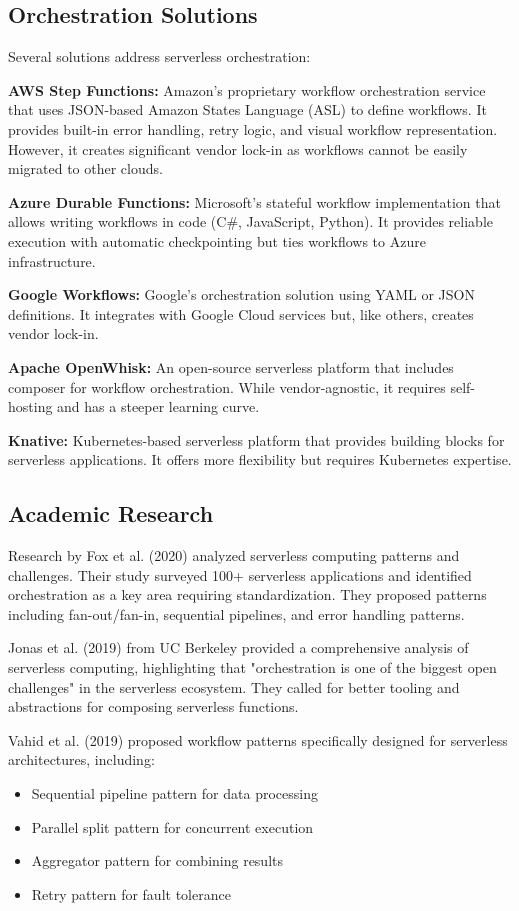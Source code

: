 \documentclass{fisatprojectfinal}
\begin{document}
\subsection{Orchestration Solutions}
Several solutions address serverless orchestration:

\textbf{AWS Step Functions:} Amazon's proprietary workflow orchestration service that uses JSON-based Amazon States Language (ASL) to define workflows. It provides built-in error handling, retry logic, and visual workflow representation. However, it creates significant vendor lock-in as workflows cannot be easily migrated to other clouds.

\textbf{Azure Durable Functions:} Microsoft's stateful workflow implementation that allows writing workflows in code (C\#, JavaScript, Python). It provides reliable execution with automatic checkpointing but ties workflows to Azure infrastructure.

\textbf{Google Workflows:} Google's orchestration solution using YAML or JSON definitions. It integrates with Google Cloud services but, like others, creates vendor lock-in.

\textbf{Apache OpenWhisk:} An open-source serverless platform that includes composer for workflow orchestration. While vendor-agnostic, it requires self-hosting and has a steeper learning curve.

\textbf{Knative:} Kubernetes-based serverless platform that provides building blocks for serverless applications. It offers more flexibility but requires Kubernetes expertise.

\subsection{Academic Research}
Research by Fox et al. (2020) analyzed serverless computing patterns and challenges. Their study surveyed 100+ serverless applications and identified orchestration as a key area requiring standardization. They proposed patterns including fan-out/fan-in, sequential pipelines, and error handling patterns.

Jonas et al. (2019) from UC Berkeley provided a comprehensive analysis of serverless computing, highlighting that "orchestration is one of the biggest open challenges" in the serverless ecosystem. They called for better tooling and abstractions for composing serverless functions.

Vahid et al. (2019) proposed workflow patterns specifically designed for serverless architectures, including:
\begin{itemize}
    \item Sequential pipeline pattern for data processing
    \item Parallel split pattern for concurrent execution
    \item Aggregator pattern for combining results
    \item Retry pattern for fault tolerance
\end{itemize}
\end{document}

